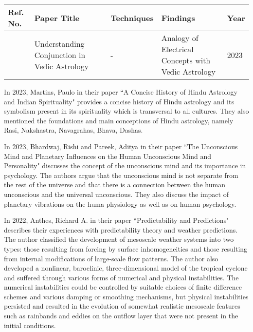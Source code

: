 \noindent
\begin{tabularx}{\columnwidth}{|M|M|M|M|M|}
	\hline
	\textbf{Ref. No.} & \textbf{Paper Title} & \textbf{Techniques} & \textbf{Findings} & \textbf{Year}\\
	\hline
	\cite{DeepanshuGiriBlog} & Understanding Conjunction in Vedic Astrology & - & Analogy of Electrical Concepts with Vedic Astrology& 2023\\
	\hline
\end{tabularx}
\vspace{2\baselineskip}

In 2023, Martins, Paulo in their paper ``A Concise History of Hindu Astrology and Indian Spirituality" provides a concise history of Hindu astrology and its symbolism present in its spirituality which is transversal to all cultures. They also mentioned the foundations and main conceptions of Hindu astrology, namely Rasi, Nakshastra, Navagrahas, Bhava, Dashas\cite{article2}.
\vspace{1\baselineskip}

In 2023, Bhardwaj, Rishi and Pareek, Aditya in their paper ``The Unconscious Mind and Planetary Influences on the Human Unconscious Mind and Personality" discusses the concept of the unconscious mind and its importance in psychology. The authors argue that the unconscious mind is not separate from the rest of the universe and that there is a connection between the human unconscious and the universal unconscious. They also discuss the impact of planetary vibrations on the huma physiology as well as on human psychology\cite{article1}.
\vspace{1\baselineskip}

In 2022, Anthes, Richard A. in their paper ``Predictability and Predictions" describes their experiences with predictability theory and weather predictions. The author classified the development of mesoscale weather systems into two types: those resulting from forcing by surface inhomogeneities and those resulting from internal modifications of large-scale flow patterns. The author also developed a nonlinear, baroclinic, three-dimensional model of the tropical cyclone and suffered through various forms of numerical and physical instabilities. The numerical instabilities could be controlled by suitable choices of finite difference schemes and various damping or smoothing mechanisms, but physical instabilities persisted and resulted in the evolution of somewhat realistic mesoscale features such as rainbands and eddies on the outflow layer that were not present in the initial conditions\cite{atmos13081292}.
\vspace{1\baselineskip}


